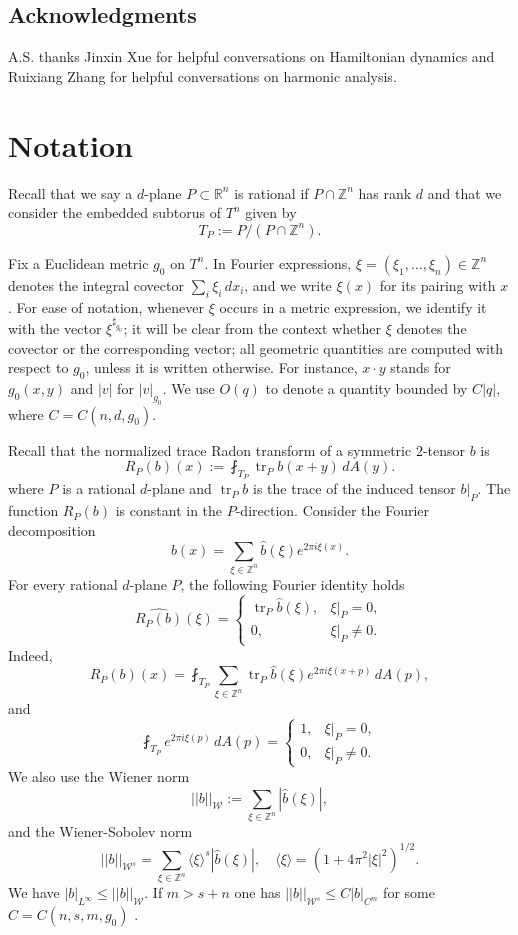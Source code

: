 \documentclass[11pt]{amsart}
\def\R{\mathbb R}
\def\Z{\mathbb Z}
\def\tr{\operatorname{tr}}
\theoremstyle{remark}
\theoremstyle{definition}
\begin{document}
	\subsection*{Acknowledgments} {A.S. thanks Jinxin Xue for helpful conversations on Hamiltonian dynamics and Ruixiang Zhang for helpful conversations on harmonic analysis.}
	
	\section{Notation}
	
	Recall that we say a $d$-plane $P\subset \R^n$ is rational if $P\cap \Z^n$ has rank $d$ {and that we consider the embedded subtorus of $T^n$  given by}
	$$
	T_P:=P/(P\cap \Z^n).
	$$
	
	{Fix a Euclidean metric $g_0$ on $T^n$. In Fourier expressions, $\xi=(\xi_1,\ldots,\xi_n)\in\Z^n$ denotes the integral covector $\sum_i\xi_i\,dx_i$, and we write $\xi(x)$ for its pairing with $x$. For ease of notation, whenever $\xi$ occurs in a metric expression, we identify it with the vector $\xi^{\sharp_{g_0}}$; it will be clear from the context whether $\xi$ denotes the covector or the corresponding vector; all geometric quantities are computed with respect to $g_0$, unless it is written otherwise.  For instance, $x\cdot y$ stands for $g_0(x,y)$ and $|v|$ for $|v|_{g_0}$. We use $O(q)$ to denote a quantity bounded by $C|q|$, where $C=C(n,d,g_0)$.}
	
	{Recall that the normalized trace Radon transform of a  symmetric $2$-tensor $b$ is 
		$$
		R_P(b)(x):=\fint_{T_P}\tr _P b(x+y)\,dA(y).
		$$
		where  $P$ is a rational $d$-plane and $\tr_P b$ is the trace of the induced tensor $b|_P$. The function $R_P(b)$ is constant in the $P$-direction.} 	
	Consider the Fourier decomposition
	$$
	b(x)=\sum_{\xi\in\Z^n}\widehat b(\xi)e^{2\pi i\xi(x)}.
	$$
	For every rational $d$-plane $P$, the following Fourier identity holds
	\begin{equation}\label{fourier.identity2}
		\widehat{R_P(b)}(\xi)
		=
		\begin{cases}
			\tr _P\widehat b(\xi), & \xi|_P=0,\\
			0, & \xi|_P\neq 0.
		\end{cases}
	\end{equation}
	Indeed,
	$$
	R_P(b)(x) = \fint_{T_P} \sum_{\xi\in\Z^n} \tr _P\widehat b(\xi)e^{2\pi i\xi(x+p)}\,dA(p),
	$$
	and
	$$
	\fint_{T_P}e^{2\pi i\xi(p)}\,dA(p)
	=
	\begin{cases}
		1, & \xi|_P=0,\\
		0, & \xi|_P\neq 0.
	\end{cases}
	$$
	We also use the Wiener norm
	$$
	||b||_{\mathcal W}:=\sum_{\xi\in\Z^n}|\widehat b(\xi)|,
	$$
	and the Wiener-Sobolev norm 
	$$||b||_{\mathcal W^s}=\sum_{\xi\in\Z^n}\langle\xi\rangle^s|\widehat b(\xi)|, \quad \langle\xi\rangle=(1+4\pi^2|\xi|^2)^{1/2}.$$
	We have $|b|_{L^\infty}\leq ||b||_{\mathcal W}$. If $m>s+n$ one has $||b||_{\mathcal W^s}\leq C|b|_{C^m}$ for some {$C=C(n,s,m,g_0)$ \cite[Corollary~3.3.10(a)]{grafakos-classical}}.\medskip
	
\end{document}
